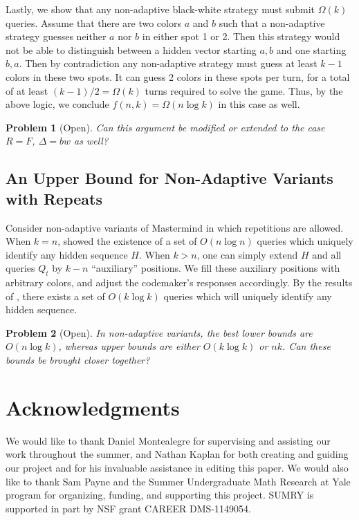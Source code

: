 \documentclass[12pt, a4paper]{article}
\newtheorem{problem}{Problem}
\begin{document}
Lastly, we show that any non-adaptive black-white strategy must submit $\Omega(k)$ queries. Assume that there are two colors $a$ and $b$ such that a non-adaptive strategy guesses neither $a$ nor $b$ in either spot 1 or 2. Then this strategy would not be able to distinguish between a hidden vector starting $a,b$ and one starting $b,a$. Then by contradiction any non-adaptive strategy must guess at least $k-1$ colors in these two spots. It can guess 2 colors in these spots per turn, for a total of at least $(k-1)/2 = \Omega(k)$ turns required to solve the game. Thus, by the above logic, we conclude $f(n,k) = \Omega(n \log k)$ in this case as well.

\begin{problem}[Open]
	Can this argument be modified or extended to the case $R = F$, $\Delta = bw$ as well?
\end{problem}
\subsection{An Upper Bound for Non-Adaptive Variants with Repeats}
Consider non-adaptive variants of Mastermind in which repetitions are allowed. When $k=n$, \cite{DS13} showed the existence of a set of $O(n \log n)$ queries which uniquely identify any hidden sequence $H$. When $k > n$, one can simply extend $H$ and all queries $Q_t$ by $k - n$ ``auxiliary'' positions. We fill these auxiliary positions with arbitrary colors, and adjust the codemaker's responses accordingly. By the results of \cite{DS13}, there exists a set of $O(k \log k)$ queries which will uniquely identify any hidden sequence.
\begin{problem}[Open]
	In non-adaptive variants, the best lower bounds are $O(n \log k)$, whereas upper bounds are either $O(k \log k)$ or $nk$. Can these bounds be brought closer together?
\end{problem}
\section{Acknowledgments}
We would like to thank Daniel Montealegre for supervising and assisting our work throughout the summer, and Nathan Kaplan for both creating and guiding our project and for his invaluable assistance in editing this paper. 
 We would also like to thank Sam Payne and the Summer Undergraduate Math Research at Yale program for organizing, funding, and supporting this project. SUMRY is supported in part by NSF grant CAREER DMS-1149054.



\end{document}
